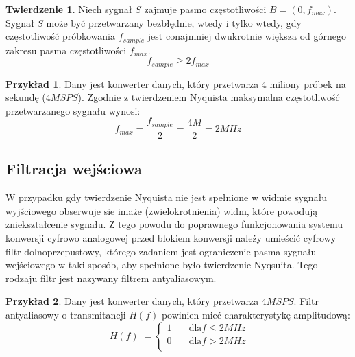 \documentclass[10pt,a4paper]{report}
\theoremstyle{definition}
\theoremstyle{definition}
\theoremstyle{definition}
\newtheorem{przyklad}{Przykład}[section]
\theoremstyle{definition}
\newtheorem{twierdzenie}{Twierdzenie}[section]
\theoremstyle{definition}
\begin{document}
	\begin{twierdzenie}{Niech sygnał $S$ zajmuje pasmo częstotliwości $B =\left(0, f_{max}\right) $. Sygnał $S$ może być przetwarzany bezbłędnie, wtedy i tylko wtedy, gdy częstotliwość próbkowania $f_{sample}$ jest conajmniej dwukrotnie większa od górnego zakresu pasma częstotliwości $f_{max}$. }
	$$
		f_{sample} \ge 2 f_{max}
	$$
	\end{twierdzenie}
	
	\begin{przyklad}{Dany jest konwerter danych, który przetwarza 4 miliony próbek na sekundę ($4MSPS$). Zgodnie z twierdzeniem Nyquista maksymalna częstotliwość przetwarzanego sygnału wynosi:}
		\begin{equation}
			f_{max} = \frac{f_{sample}}{2} = \frac{4M}{2} = 2MHz
		\end{equation}
	\end{przyklad}
	
	\subsection{Filtracja wejściowa}
	{	W przypadku gdy twierdzenie Nyquista nie jest spełnione w widmie sygnału wyjściowego obserwuje sie imaże (zwielokrotnienia) widm, które powodują zniekształcenie sygnału. Z tego powodu do poprawnego funkcjonowania systemu konwersji cyfrowo analogowej przed blokiem konwersji należy umieścić cyfrowy filtr dolnoprzepustowy, którego zadaniem jest ograniczenie pasma sygnału wejściowego w taki sposób, aby spełnione było twierdzenie Nyqsuita. Tego rodzaju filtr jest nazywany filtrem antyaliasowym. }
	
	\begin{przyklad}{Dany jest konwerter danych, który przetwarza $4MSPS$. Filtr antyaliasowy o transmitancji $H(f)$ powinien mieć charakterystykę amplitudową:}
		\[   
		|H(f)| = 
		\begin{cases}
			1 &\quad \text{dla} f \le 2MHz\\
			0 &\quad \text{dla} f>2MHz\\
		\end{cases}
		\]		
	\end{przyklad}
	\begin{figure}[!htb]
	\centering
	\end{figure}
		
\end{document}
